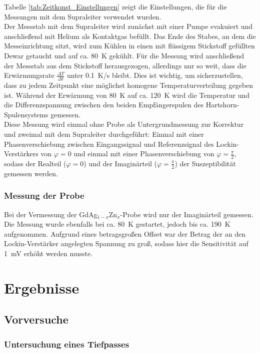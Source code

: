 \documentclass[12pt,a4paper]{article}
\begin{document}
Tabelle \ref{tab:Zeitkonst_Einstellungen} zeigt die Einstellungen, die für die Messungen mit dem Supraleiter verwendet wurden. \\
Der Messstab mit dem Supraleiter wird zunächst mit einer Pumpe evakuiert und anschließend mit Helium als Kontaktgas befüllt. Das Ende des Stabes, an dem die Messeinrichtung sitzt, wird zum Kühlen in einen mit flüssigem Stickstoff gefüllten Dewar getaucht und auf ca. \SI{80}{K} gekühlt. Für die Messung wird anschließend der Messstab aus dem Stickstoff herausgezogen, allerdings nur so weit, dass die Erwärmungsrate $\frac{\Delta T}{\Delta t}$ unter \SI{0,1}{K/s} bleibt. Dies ist wichtig, um sicherzustellen, dass zu jedem Zeitpunkt eine möglichst homogene Temperaturverteilung gegeben ist. Während der Erwärmung von \SI{80}{K} auf ca. \SI{120}{K} wird die Temperatur und die Differenzspannung zwischen den beiden Empfängerspulen des Hartshorn-Spulensystems gemessen. \\
Diese Messung wird einmal ohne Probe als Untergrundmessung zur Korrektur und zweimal mit dem Supraleiter durchgeführt: Einmal mit einer Phasenverschiebung zwischen Eingangssignal und Referenzsignal des Lockin-Verstärkers von $\varphi = 0$ und einmal mit einer Phasenverschiebung von $\varphi = \frac{\pi}{2}$, sodass der Realteil ($\varphi = 0$) und der Imaginärteil ($\varphi = \frac{\pi}{2}$) der Suszeptibilität gemessen werden.

\subsubsection{Messung der Probe}
Bei der Vermessung der GdAg$_{1-x}$Zn$_x$-Probe wird nur der Imaginärteil gemessen. Die Messung wurde ebenfalls bei ca. \SI{80}{K} gestartet, jedoch bis ca. \SI{190}{K} aufgenommen. Aufgrund eines betragsgroßen Offset war der Betrag der an den Lockin-Verstärker angelegten Spannung zu groß, sodass hier die Sensitivität auf \SI{1}{mV} erhöht werden musste.

\section{Ergebnisse}
\subsection{Vorversuche}
\subsubsection{Untersuchung eines Tiefpasses}
\end{document}
